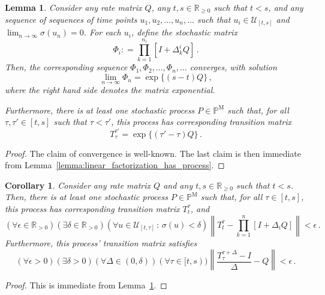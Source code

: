 \documentclass[10pt]{paper}
\newtheorem{corollary}[theorem]{Corollary}
\newtheorem{lemma}[theorem]{Lemma}
\newcommand{\reals}{\mathbb{R}}
\newcommand{\realspos}{\reals_{>0}}
\newcommand{\realsnonneg}{\reals_{\geq 0}}
\newcommand{\processes}{\mathbb{P}}
\newcommand{\mprocesses}{\processes^{\mathrm{M}}}
\newcommand{\norm}[1]{\left\lVert #1 \right\rVert}
\newcommand{\coloneqq}{:\!=}
\begin{document}
\begin{lemma}\label{lemma:exponential_matrix_has_process}
Consider any rate matrix $Q$, any $t,s\in\realsnonneg$ such that $t<s$, and any sequence of sequences of time points $u_1,u_2,\ldots,u_n,\ldots$ such that $u_i\in\mathcal{U}_{[t,s]}$ and $\lim_{n\rightarrow\infty}\sigma(u_n)= 0$. For each $u_i$, define the stochastic matrix
\begin{equation*}
\Phi_i \coloneqq \prod_{k=1}^{n_i} [I+\Delta^i_k Q]\,.
\end{equation*}
Then, the corresponding sequence $\Phi_1,\Phi_2,\ldots,\Phi_n,\ldots$ converges, with solution
\begin{equation*}
\lim_{n\rightarrow\infty}\Phi_n = \exp\{(s-t)Q\}\,,
\end{equation*}
where the right hand side denotes the matrix exponential.

Furthermore, there is at least one stochastic process $P\in\mprocesses$ such that, for all $\tau,\tau'\in[t,s]$ such that $\tau<\tau'$, this process has corresponding transition matrix
\begin{equation*}
T_\tau^{\tau'} = \exp\{(\tau'-\tau)Q\}\,.
\end{equation*}
\end{lemma}
\begin{proof}
The claim of convergence is well-known. The last claim is then immediate from Lemma~\ref{lemma:linear_factorization_has_process}.
\end{proof}

\begin{corollary}\label{corollary:exponential_process_approximates_everywhere_and_has_derivative}
Consider any rate matrix $Q$ and any $t,s\in\realsnonneg$ such that $t<s$. Then, there is at least one stochastic process $P\in\mprocesses$ such that, for all $\tau\in[t,s]$, this process has corresponding transition matrix $T_t^\tau$, and
\begin{equation*}
(\forall \epsilon\in\realspos)(\exists \delta\in\realspos)(\forall u\in\mathcal{U}_{[t,\tau]}\,:\,\sigma(u)<\delta) \norm{T_t^\tau - \prod_{k=1}^n[I+\Delta_i Q]} < \epsilon\,.
\end{equation*}
Furthermore, this process' transition matrix satisfies
\begin{equation*}
(\forall \epsilon>0)(\exists \delta>0)(\forall \Delta\in(0,\delta))(\forall \tau\in[t,s))\norm{\frac{T_\tau^{\tau+\Delta} - I}{\Delta} - Q} < \epsilon\,.
\end{equation*}
\end{corollary}
\begin{proof}
This is immediate from Lemma~\ref{lemma:exponential_matrix_has_process}.
\end{proof}
\end{document}
